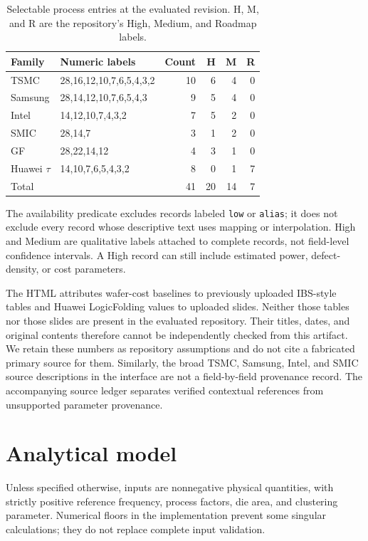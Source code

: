 \documentclass[11pt,a4paper]{article}
\begin{document}
\begin{table}[htbp]
\centering\small
\caption{Selectable process entries at the evaluated revision. H, M, and R
are the repository's High, Medium, and Roadmap labels.}
\label{tab:coverage}
\begin{tabular}{llrrrr}
\toprule
Family & Numeric labels & Count & H & M & R\\
\midrule
TSMC & 28,16,12,10,7,6,5,4,3,2 & 10 & 6 & 4 & 0\\
Samsung & 28,14,12,10,7,6,5,4,3 & 9 & 5 & 4 & 0\\
Intel & 14,12,10,7,4,3,2 & 7 & 5 & 2 & 0\\
SMIC & 28,14,7 & 3 & 1 & 2 & 0\\
GF & 28,22,14,12 & 4 & 3 & 1 & 0\\
Huawei $\tau$ & 14,10,7,6,5,4,3,2 & 8 & 0 & 1 & 7\\
\midrule
Total & & 41 & 20 & 14 & 7\\
\bottomrule
\end{tabular}
\end{table}

The availability predicate excludes records labeled \texttt{low} or
\texttt{alias}; it does not exclude every record whose descriptive text uses
mapping or interpolation. High and Medium are qualitative labels attached
to complete records, not field-level confidence intervals. A High record can
still include estimated power, defect-density, or cost parameters.

The HTML attributes wafer-cost baselines to previously uploaded IBS-style
tables and Huawei LogicFolding values to uploaded slides. Neither those
tables nor those slides are present in the evaluated repository. Their
titles, dates, and original contents therefore cannot be independently
checked from this artifact. We retain these numbers as repository assumptions
and do not cite a fabricated primary source for them. Similarly, the broad
TSMC, Samsung, Intel, and SMIC source descriptions in the interface are not
a field-by-field provenance record. The accompanying source ledger separates
verified contextual references from unsupported parameter provenance.

\section{Analytical model}
Unless specified otherwise, inputs are nonnegative physical quantities, with
strictly positive reference frequency, process factors, die area, and
clustering parameter. Numerical floors in the implementation prevent some
singular calculations; they do not replace complete input validation.
\end{document}
